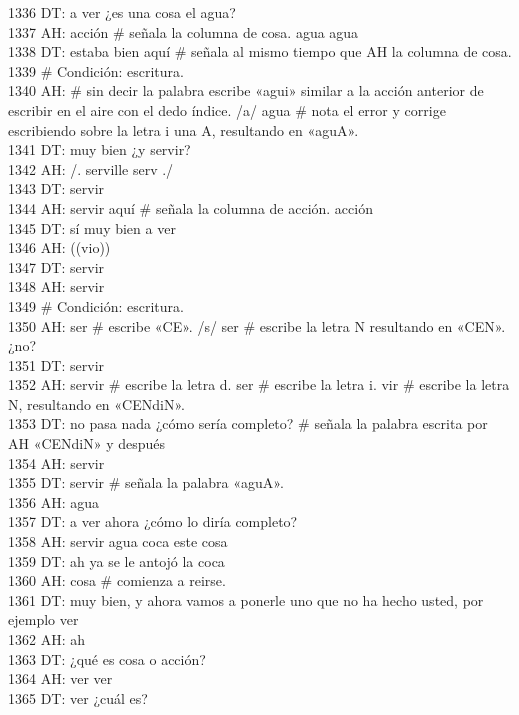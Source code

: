 1336 DT: a ver ¿es una cosa el agua?\\
1337 AH: acción # señala la columna de cosa. agua agua\\
1338 DT: estaba bien aquí # señala al mismo tiempo que AH la columna de cosa.\\
1339 # Condición: escritura.\\
1340 AH: # sin decir la palabra escribe «agui» similar a la acción anterior de escribir en el aire con el dedo índice. /a/ agua # nota el error y corrige escribiendo sobre la letra i una A, resultando en «aguA».\\
1341 DT: muy bien ¿y servir?\\
1342 AH: /. serville serv ./ \\
1343 DT: servir\\
1344 AH: servir aquí # señala la columna de acción. acción\\
1345 DT: sí muy bien a ver\\
1346 AH: ((vio))\\
1347 DT: servir\\
1348 AH: servir\\
1349 # Condición: escritura.\\
1350 AH: ser # escribe «CE». /s/ ser # escribe la letra N resultando en «CEN». ¿no?\\
1351 DT: servir\\
1352 AH: servir # escribe la letra d. ser # escribe la letra i. vir # escribe la letra N, resultando en «CENdiN».\\
1353 DT: no pasa nada ¿cómo sería completo? # señala la palabra escrita por AH «CENdiN» y después\\
1354 AH: servir\\
1355 DT: servir # señala la palabra «aguA».\\
1356 AH: agua\\
1357 DT: a ver ahora ¿cómo lo diría completo?\\
1358 AH: servir agua coca este cosa\\
1359 DT: ah ya se le antojó la coca\\
1360 AH: cosa # comienza a reirse.\\
1361 DT: muy bien, y ahora vamos a ponerle uno que no ha hecho usted, por ejemplo ver\\
1362 AH: ah\\
1363 DT: ¿qué es cosa o acción?\\
1364 AH: ver ver\\
1365 DT: ver ¿cuál es?\\
